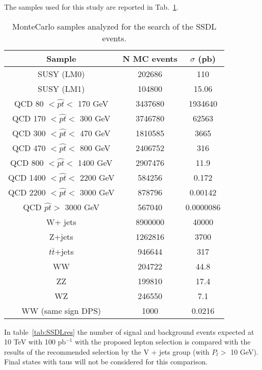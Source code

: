 The samples used for this study are reported in Tab.~\ref{tab:SSDLsamples}.
\begin{table}[htb]

\begin{center}
\begin{tabular}{|c|c|c|}
\hline
Sample  &  N MC events & $\sigma$ (pb) \\
\hline
SUSY (LM0) & 202686 & 110\\
SUSY (LM1) & 104800 & 15.06\\
\hline
QCD 80 $<\hat{pt}<$ 170 GeV&3437680 & 1934640\\
QCD 170 $<\hat{pt}<$ 300 GeV &3746780 & 62563\\
QCD 300 $<\hat{pt}<$ 470 GeV & 1810585& 3665\\
QCD 470 $<\hat{pt}<$ 800 GeV &2406752 & 316\\
QCD 800 $<\hat{pt}<$ 1400 GeV &2907476	 & 11.9\\
QCD 1400 $<\hat{pt}<$ 2200 GeV &584256 & 0.172\\
QCD 2200 $<\hat{pt}<$ 3000 GeV &878796 & 0.00142\\
QCD $\hat{pt}>$ 3000 GeV &567040 & 0.0000086\\
\hline
W+ jets&8900000 & 40000 \\
\hline
Z+jets& 1262816& 3700\\
\hline
$t \bar{t}$+jets& 946644& 317 \\
\hline
WW  & 204722 & 44.8 \\
ZZ & 199810 & 17.4 \\
WZ &246550 & 7.1\\
WW (same sign DPS) &1000 & 0.0216\\
\hline
\end{tabular}
\caption{\small{MonteCarlo samples analyzed for the search of the SSDL events.}\label{tab:SSDLsamples}}
\end{center}
\end{table}


In table~\ref{tab:SSDLres} the number of signal and background events
expected at 10 TeV with 100 pb$^{-1}$
with the proposed lepton selection
is compared with the results of the recommended selection by the
V + jets group (with $P_t >$ 10 GeV).
Final states with taus will not be considered for this comparison.

